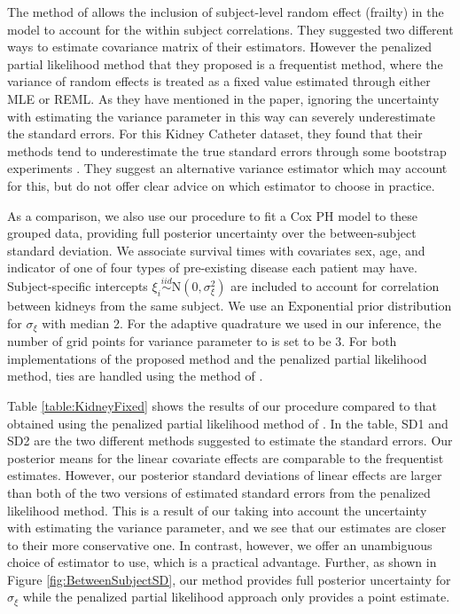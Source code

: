 \documentclass[ba]{imsart}
\begin{document}
The method of \cite{freqPL} allows the inclusion of subject-level random effect (frailty) in the model to account for the within subject correlations. They suggested two different ways to estimate covariance matrix of their estimators. However the penalized partial likelihood method that they proposed is a frequentist method, where the variance of random effects is treated as a fixed value estimated through either MLE or REML. As they have mentioned in the paper, ignoring the uncertainty with estimating the variance parameter in this way can severely underestimate the standard errors. For this Kidney Catheter dataset, they found that their methods tend to underestimate the true standard errors through some bootstrap experiments \citep{freqPL}. They suggest an alternative variance estimator which may account for this, but do not offer clear advice on which estimator to choose in practice.

As a comparison, we also use our procedure to fit a Cox PH model to these grouped data, providing full posterior uncertainty over the between-subject standard deviation. We associate survival times with covariates sex, age, and indicator of one of four types of pre-existing disease each patient may have. Subject-specific intercepts $\xi_{i}\overset{iid}{\sim}\text{N}(0,\sigma^{2}_{\xi})$ are included to account for correlation between kidneys from the same subject. We use an $\text{Exponential}$ prior distribution for $\sigma_{\xi}$ with median 2. For the adaptive quadrature we used in our inference, the number of grid points for variance parameter to is set to be 3. For both implementations of the proposed method and the penalized partial likelihood method, ties are handled using the method of \cite{Breslow}.

Table \ref{table:KidneyFixed} shows the results of our procedure compared to that obtained using the penalized partial likelihood method of \cite{freqPL}. In the table, SD1 and SD2 are the two different methods \cite{freqPL} suggested to estimate the standard errors. Our posterior means for the linear covariate effects are comparable to the frequentist estimates. However, our posterior standard deviations of linear effects are larger than both of the two versions of estimated standard errors from the penalized likelihood method. This is a result of our taking into account the uncertainty with estimating the variance parameter, and we see that our estimates are closer to their more conservative one. In contrast, however, we offer an unambiguous choice of estimator to use, which is a practical advantage. Further, as shown in Figure \ref{fig:BetweenSubjectSD}, our method provides full posterior uncertainty for $\sigma_{\xi}$ while the penalized partial likelihood approach only provides a point estimate.
\end{document}
